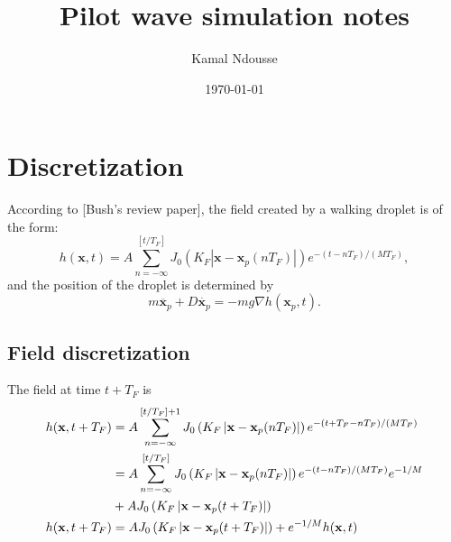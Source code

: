 \documentclass{article}
\newcommand{\x}{\mathbf{x}}
\begin{document}
\title{Pilot wave simulation notes}
\author{Kamal Ndousse}
\date{\today}

\maketitle

\section{Discretization}

According to [Bush's review paper], the field created by a walking droplet is of the form:
\begin{equation}
	\label{eq:raw_field}
	h(\x,t) = A \sum_{n = -\infty}^{\left[ t/T_{F} \right]} J_{0} \left( K_{F} \left| \x - \x_{p}(n T_{F}) \right| \right) e^{-(t - n T_{F})/(M T_{F})},
\end{equation}
and the position of the droplet is determined by
\begin{equation}
	\label{eq:raw_droplet}
	m \ddot{\x_p} + D \dot{\x_p} = - m g \nabla h(\x_p,t).
\end{equation}

\subsection{Field discretization}
The field at time $t + T_{F}$ is
\begin{align}
	h(\x,t+T_F) &= A \sum_{n = -\infty}^{\left[ t/T_{F} \right]+1} J_{0} \left( K_{F} \left| \x - \x_{p}(n T_{F}) \right| \right) e^{-(t +T_F- n T_{F})/(M T_{F})} \notag \\
	 &= A \sum_{n = -\infty}^{\left[ t/T_{F} \right]} J_{0} \left( K_{F} \left| \x - \x_{p}(n T_{F}) \right| \right) e^{-(t- n T_{F})/(M T_{F})} e^{-1/M} \notag \\
	 & + A J_{0} \left( K_F \left| \x - \x_p(t + T_F) \right| \right) \notag \\
	h(\x,t+T_F) &= A J_0 \left( K_F \left| \x - \x_p(t + T_F) \right | \right) + e^{-1/M} h(\x,t) \label{eq:discrete_field}
\end{align}
\end{document}
